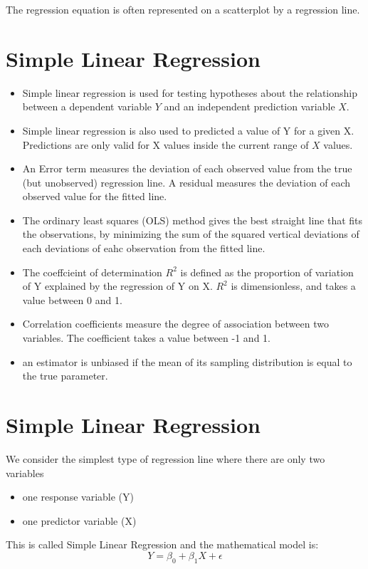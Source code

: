 \documentclass[]{report}
\begin{document}
The regression equation is often represented on a scatterplot by a regression line.



	\section{Simple Linear Regression }
	\begin{itemize}
		\item 
		Simple linear regression is used for testing hypotheses about the relationship between a dependent variable $Y$ and an independent prediction variable $X$.
		
		\item 	Simple linear regression is also used to predicted a value of Y for a given X. Predictions are only valid for X values inside 
		the current range of $X$ values. 
		
		\item 	An Error term measures the deviation of each observed value from the true (but unobserved) regression line.
		A residual measures the deviation of each observed value for the fitted line.
		
		\item 	The ordinary least squares (OLS) method gives the best straight line that fits the observations, by minimizing the sum of the
		squared vertical deviations of each deviations of eahc observation from the fitted line.
		\item The coeffcieint of determination $R^2$ is defined as the proportion of variation of Y explained by the regression of Y on X. $R^2$ is dimensionless, and takes a value between 0 and 1.
		
		\item 	Correlation coefficients measure the degree of association between two variables. The coefficient takes a value between -1 and 1.
		
		\item 	an estimator is unbiased if the mean of its sampling distribution is equal to the true parameter.
	\end{itemize}
	

\section{Simple Linear Regression}
We consider the simplest type of regression line where there are only two
variables
\begin{itemize}
	\item  one response variable (Y)
	\item one predictor variable (X)
\end{itemize}
This is called Simple Linear Regression and the mathematical model is:
\[ Y = \beta_0 + \beta_1X + \epsilon \]
\end{document}
